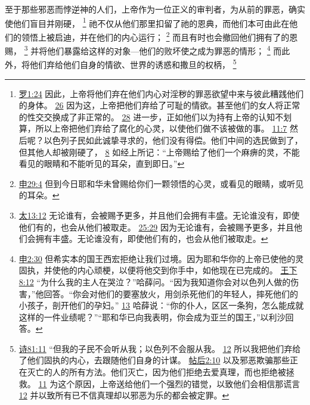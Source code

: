 \documentclass[12pt, a4paper, oneside]{ctexart}
\newcounter{parnum}[section]
\newcommand{\N}{%
   \noindent\refstepcounter{parnum}%
    \makebox[\parindent][l]{\textbf{\arabic{parnum}.}}}
\begin{document}
\N 至于那些邪恶而悖逆神的人们，上帝作为一位正义的审判者，为从前的罪恶，确实使他们盲目并刚硬，
	\footnote {
		\href{https://biblehub.com/romans/1-24.htm}{罗1:24} 因此，上帝将他们弃在他们内心对淫秽的罪恶欲望中来与彼此糟践他们的身体。
		\href{https://biblehub.com/romans/1-26.htm}{26} 因为这，上帝把他们弃给了可耻的情欲。甚至他们的女人将正常的性交交换成了非正常的。
		\href{https://biblehub.com/romans/1-28.htm}{28} 进一步，正如他们以为持有上帝的认知不划算，所以上帝把他们弃给了腐化的心灵，以使他们做不该被做的事。
		\href{https://biblehub.com/romans/11-7.htm}{11:7} 然后呢？以色列子民如此诚挚寻求的，他们没有得偿。他们中间的选民做到了，但其他人却被刚硬了，
		\href{https://biblehub.com/romans/11-8.htm}{8} 如经上所记：“上帝赐给了他们一个麻痹的灵，不能看见的眼睛和不能听见的耳朵，直到即日。”
	}
	祂不仅从他们那里扣留了祂的恩典，而他们本可由此在他们的领悟上被启迪，并在他们的内心运行；
	\footnote {
		\href{https://biblehub.com/deuteronomy/29-4.htm}{申29:4} 但到今日耶和华未曾赐给你们一颗领悟的心灵，或看见的眼睛，或听见的耳朵。
	}
	而且有时也会撤回他们拥有了的恩赐，
	\footnote {
		\href{https://biblehub.com/matthew/13-12.htm}{太13:12} 无论谁有，会被赐予更多，并且他们会拥有丰盛。无论谁没有，即使他们有的，也会从他们被取走。
		\href{https://biblehub.com/matthew/25-29.htm}{25:29} 因为无论谁有，会被赐予更多，并且他们会拥有丰盛。无论谁没有，即使他们有的，也会从他们被取走。
	}
	并将他们暴露给这样的对象---他们的败坏使之成为罪恶的情形；
	\footnote {
		\href{https://biblehub.com/deuteronomy/2-30.htm}{申2:30} 但希实本的国王西宏拒绝让我们过境。因为耶和华你的上帝已使他的灵固执，并使他的内心顽梗，以便将他交到你手中，如他现在已完成的。
		\href{https://biblehub.com/2_kings/8-12.htm}{王下8:12} “为什么我的主人在哭泣？”哈薛问。“因为我知道你会对以色列人做的伤害，”他回答。“你会对他们的要塞放火，用剑杀死他们的年轻人，摔死他们的小孩子，剖开他们的孕妇。”
		\href{https://biblehub.com/2_kings/8-13.htm}{13} 哈薛说：“你的仆人，区区一条狗，怎么能成就这样的一件业绩呢？”“耶和华已向我表明，你会成为亚兰的国王，”以利沙回答。
	}
	而此外，将他们弃给他们自身的情欲、世界的诱惑和撒旦的权柄，
	\footnote {
		\href{https://biblehub.com/psalms/81-11.htm}{诗81:11} “但我的子民不会听从我；以色列不会服从我。
		\href{https://biblehub.com/psalms/81-12.htm}{12} 所以我把他们弃给了他们固执的内心，去跟随他们自身的计谋。
		\href{https://biblehub.com/2_thessalonians/2-10.htm}{帖后2:10} 以及邪恶欺骗那些正在灭亡的人的所有方法。他们灭亡，因为他们拒绝去爱真理，而也拒绝被拯救。
		\href{https://biblehub.com/2_thessalonians/2-11.htm}{11} 为这个原因，上帝送给他们一个强烈的错觉，以致他们会相信那谎言
		\href{https://biblehub.com/2_thessalonians/2-12.htm}{12} 并以致所有已不信真理却以邪恶为乐的都会被定罪。
	}
\end{document}

